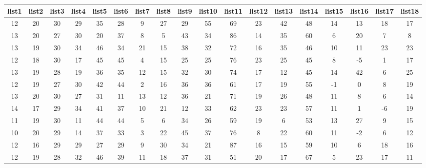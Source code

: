 \begin{sidewaystable}
    \centering
    \begin{tabular}{cccccccccccccccccc}
    list1 & list2 & list3 & list4 & list5 & list6 & list7 & list8 & list9 & list10 & list11 & list12 & list13 & list14 & list15 & list16 & list17 & list18 \\ \hline
    12    & 20    & 30    & 29    & 35    & 28    & 9     & 27    & 29    & 55     & 69     & 23     & 42     & 48     & 14     & 13     & 18     & 17     \\
    13    & 20    & 27    & 30    & 20    & 37    & 8     & 5     & 43    & 34     & 86     & 14     & 35     & 60     & 6      & 20     & 7      & 8      \\
    13    & 19    & 30    & 34    & 46    & 34    & 21    & 15    & 38    & 32     & 72     & 16     & 35     & 46     & 10     & 11     & 23     & 23     \\
    12    & 18    & 30    & 17    & 45    & 45    & 4     & 15    & 25    & 25     & 76     & 23     & 25     & 45     & 8      & -5     & 1      & 17     \\
    13    & 19    & 28    & 19    & 36    & 35    & 12    & 15    & 32    & 30     & 74     & 17     & 12     & 45     & 14     & 42     & 6      & 25     \\
    12    & 19    & 27    & 30    & 42    & 44    & 2     & 16    & 36    & 36     & 61     & 17     & 19     & 55     & -1     & 0      & 8      & 19     \\
    13    & 20    & 30    & 27    & 31    & 11    & 13    & 12    & 36    & 21     & 71     & 19     & 26     & 48     & 11     & 8      & 6      & 14     \\
    14    & 17    & 29    & 34    & 41    & 37    & 10    & 21    & 12    & 33     & 62     & 23     & 23     & 57     & 11     & 1      & -6     & 19     \\
    11    & 19    & 30    & 11    & 44    & 44    & 5     & 6     & 34    & 26     & 59     & 19     & 6      & 53     & 13     & 27     & 9      & 15     \\
    10    & 20    & 29    & 14    & 37    & 33    & 3     & 22    & 45    & 37     & 76     & 8      & 22     & 60     & 11     & -2     & 6      & 12     \\
    12    & 16    & 29    & 29    & 27    & 29    & 9     & 30    & 34    & 21     & 87     & 16     & 15     & 59     & 10     & 6      & 18     & 16     \\
    12    & 19    & 28    & 32    & 46    & 39    & 11    & 18    & 37    & 31     & 51     & 20     & 17     & 67     & 5      & 23     & 17     & 11     \\

\end{tabular}
\end{sidewaystable}
